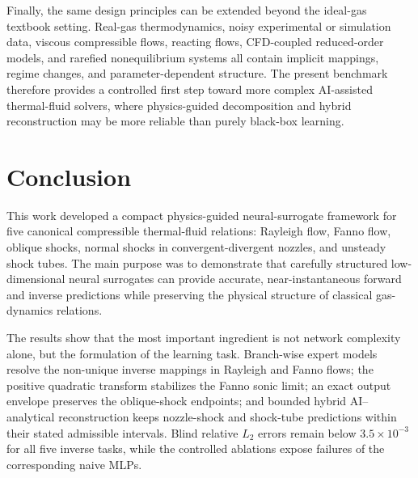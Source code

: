 \documentclass[preprint,12pt]{elsarticle}
\newcommand{\rev}[1]{#1}
\newcommand{\rev}[1]{\textcolor{revisionblue}{#1}}
\begin{document}
Finally, the same design principles can be extended beyond the ideal-gas textbook setting. Real-gas thermodynamics, noisy experimental or simulation data, viscous compressible flows, reacting flows, CFD-coupled reduced-order models, and rarefied nonequilibrium systems all contain implicit mappings, regime changes, and parameter-dependent structure. The present benchmark therefore provides a controlled first step toward more complex AI-assisted thermal-fluid solvers, where physics-guided decomposition and hybrid reconstruction may be more reliable than purely black-box learning.

\section{Conclusion}
This work developed a compact physics-guided neural-surrogate framework for five canonical compressible thermal-fluid relations: Rayleigh flow, Fanno flow, oblique shocks, normal shocks in convergent-divergent nozzles, and unsteady shock tubes. The main purpose was to demonstrate that carefully structured low-dimensional neural surrogates can provide accurate, near-instantaneous forward and inverse predictions while preserving the physical structure of classical gas-dynamics relations.

The results show that the most important ingredient is not network complexity alone, but the formulation of the learning task. Branch-wise expert models resolve the non-unique inverse mappings in Rayleigh and Fanno flows; the positive quadratic transform stabilizes the Fanno sonic limit; an exact output envelope preserves the oblique-shock endpoints; and bounded hybrid AI--analytical reconstruction keeps nozzle-shock and shock-tube predictions within their stated admissible intervals. \rev{Blind relative $L_2$ errors remain below $3.5\times10^{-3}$ for all five inverse tasks, while the controlled ablations expose failures of the corresponding naive MLPs.}
\end{document}
